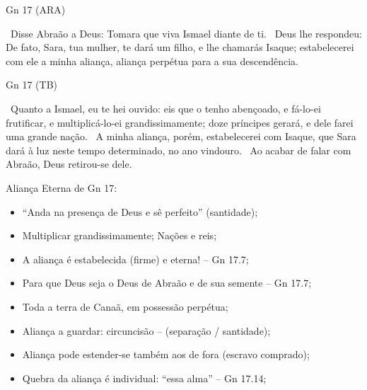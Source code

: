 \documentclass[12pt,aspectratio=169]{beamer}
\newcommand{\ver}[1]{%
    \raisebox{0.50ex}{%
        \scalebox{1.1}{%
            \pmb{\textbf{\textcolor{BSpbg}{#1}}}%
        }%
    }%
}
\newcommand{\QUOTE}[1]{%
    \par\noindent\hspace*{0.05\linewidth}%
    \begin{minipage}{0.9\linewidth}%
        \linespread{1.35}\large{#1}%
    \end{minipage}%
}
\newcommand{\RED}[1]{{\textcolor{TXred}{#1}}}
\newcommand{\ORA}[1]{{\textcolor{TXred!50!TXyel}{#1}}}
\newcommand{\YEL}[1]{{\textcolor{TXyel}{#1}}}
\newcommand{\GRE}[1]{{\textcolor{TXgre}{#1}}}
\newcommand{\CYA}[1]{{\textcolor{TXcya}{#1}}}
\newcommand{\BLU}[1]{{\textcolor{TXblu}{#1}}}
\newcommand{\MAG}[1]{{\textcolor{TXmag}{#1}}}
\newcommand{\BRI}[1]{{\textcolor{BSpbg}{#1}}}   %
\begin{document}
    \begin{frame}{\BRI{Gn 17} (ARA)}
        \QUOTE{%
            \ver{18}~Disse Abraão a Deus: Tomara que viva Ismael diante de ti.
            \ver{19}~Deus lhe respondeu: \CYA{De fato}, Sara, tua mulher, te dará um filho, e
            lhe chamarás \GRE{Isaque}; \YEL{estabelecerei com ele a minha aliança, aliança
            perpétua para a sua descendência}.
        }
    \end{frame}

    \begin{frame}{\BRI{Gn 17} (TB)}
        \QUOTE{%
            \ver{20}~Quanto a Ismael, eu te hei ouvido: eis que o tenho abençoado, e fá-lo-ei
            frutificar, e multiplicá-lo-ei grandissimamente; doze príncipes gerará, e dele farei
            uma grande nação.
            \ver{21}~\YEL{A minha aliança, porém, estabelecerei com Isaque}, que Sara dará à luz
            neste tempo determinado, no ano vindouro.
            \ver{22}~Ao acabar de falar com Abraão, Deus retirou-se dele.
        }
    \end{frame}

    \begin{frame}{\YEL{Aliança Eterna} de \BRI{Gn 17}:}
        \begin{itemize}
            \item<1-> ``\MAG{Anda na presença} de Deus e \MAG{sê perfeito}'' (santidade);
            \item<1-> Multiplicar \YEL{grandissimamente}; Nações e \GRE{reis};
            \item<1-> A aliança é \YEL{estabelecida} (firme) e \CYA{eterna!} -- Gn 17.7;
            \item<1-> Para que \BLU{Deus seja o Deus de Abraão e de sua semente} -- Gn 17.7;
            \item<2-> Toda a \YEL{terra} de Canaã, em \GRE{possessão} \YEL{perpétua};
            \item<2-> Aliança a guardar: \MAG{circuncisão} -- (separação / santidade);
            \item<2-> Aliança pode estender-se também \ORA{aos de fora} (escravo comprado);
            \item<2-> \RED{Quebra} da aliança é \YEL{individual}: ``\YEL{essa alma}'' -- Gn
                17.14;
        \end{itemize}
    \end{frame}
\end{document}
